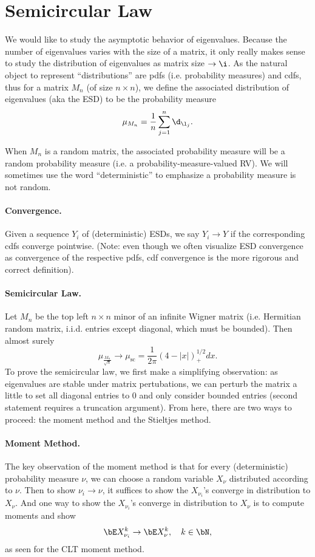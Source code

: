 \section*{Semicircular Law}

We would like to study the asymptotic behavior of eigenvalues. Because the number of eigenvalues varies with the size of a matrix, it only really makes sense to study the distribution of eigenvalues as matrix size $\to \i$. As the natural object to represent ``distributions'' are pdfs (i.e. probability measures) and cdfs, thus for a matrix $M_n$ (of size $n \times n$), we define the associated distribution of eigenvalues (aka the ESD) to be the probability measure
\[
    \mu_{M_n} = \frac{1}{n} \sum_{j = 1}^n \d_{\l_j}.
\]

When $M_n$ is a random matrix, the associated probability measure will be a random probability measure (i.e. a probability-measure-valued RV). We will sometimes use the word ``deterministic'' to emphasize a probability measure is not random.

\paragraph{Convergence.} Given a sequence $Y_i$ of (deterministic) ESDs, we say $Y_i \to Y$ if the corresponding cdfs converge pointwise. (Note: even though we often visualize ESD convergence as convergence of the respective pdfs, cdf convergence is the more rigorous and correct definition).

\paragraph{Semicircular Law.} Let $M_n$ be the top left $n \times n$ minor of an infinite Wigner matrix (i.e. Hermitian random matrix, i.i.d. entries except diagonal, which must be bounded). Then almost surely
\[
    \mu_{\frac{M_n}{\sqrt{n}}} \to \mu_{\text{sc}} = \frac{1}{2\pi}(4 - |x|)_+^{1/2}dx.
\]
To prove the semicircular law, we first make a simplifying observation: as eigenvalues are stable under matrix pertubations, we can perturb the matrix a little to set all diagonal entries to 0 and only consider bounded entries (second statement requires a truncation argument). From here, there are two ways to proceed: the moment method and the Stieltjes method.

\paragraph{Moment Method.} The key observation of the moment method is that for every (deterministic) probability measure $\nu$, we can choose a random variable $X_{\nu}$ distributed according to $\nu$. Then to show $\nu_i \to \nu$, it suffices to show the $X_{\nu_i}$'s converge in distribution to $X_{\nu}$. And one way to show the $X_{\nu_i}$'s converge in distribution to $X_{\nu}$ is to compute moments and show
\[
    \bE X_{\nu_i}^k \to \bE X_{\nu}^k, \quad k \in \bN,
\]
as seen for the CLT moment method.

